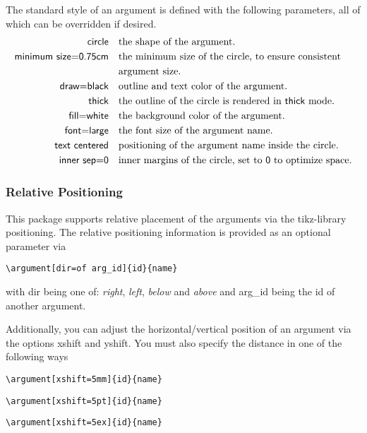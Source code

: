 \documentclass{article}
\begin{document}
    The \textsf{standard} style of an argument is defined with the following parameters, all of which can be overridden if desired.
    \begin{align*}
        \textsf{circle} &\quad \text{the shape of the argument.}\\
        \textsf{minimum~size=0.75cm} &\quad \text{the minimum size of the circle, to ensure consistent}\\
        &\quad \text{argument size.}\\
        \textsf{draw=black} &\quad \text{outline and text color of the argument.}\\
        \textsf{thick} &\quad \text{the outline of the circle is rendered in \textsf{thick} mode.}\\
        \textsf{fill=white} &\quad \text{the background color of the argument.}\\
        \textsf{font=large} &\quad \text{the font size of the argument name.}\\
        \textsf{text~centered} &\quad \text{positioning of the argument name inside the circle.}\\
        \textsf{inner~sep=0} &\quad \text{inner margins of the circle, set to \textsf{0} to optimize space.}
    \end{align*}
    \subsubsection{Relative Positioning}    
    This package supports relative placement of the arguments via the \textsf{tikz}-library \textsf{positioning}.
    The relative positioning information is provided as an optional parameter via
    
    \verb|\argument[dir=of arg_id]{id}{name}|
    
    \noindent
    with \textsf{dir} being one of: \emph{right}, \emph{left}, \emph{below} and \emph{above} and \textsf{arg\_id} being the id of another argument.
    
    Additionally, you can adjust the horizontal/vertical position of an argument via the options \textsf{xshift} and \textsf{yshift}.
    You must also specify the distance in one of the following ways

    \verb|\argument[xshift=5mm]{id}{name}|

    \verb|\argument[xshift=5pt]{id}{name}|

    \verb|\argument[xshift=5ex]{id}{name}|
\end{document}
